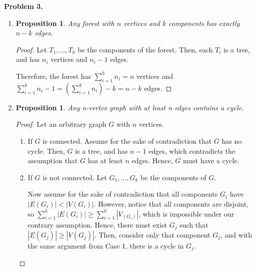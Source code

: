 \documentclass{article}
\newtheorem{prop}[thm]{Proposition}
\begin{document}
\textbf{Problem 3.}
\begin{enumerate}[label=(\alph*)]
    \item \begin{prop}
        Any forest with $n$ vertices and $k$ components has exactly $n-k$ edges. 
    \end{prop}
    \begin{proof}
        Let $T_1, \dots, T_k$ be the components of the forest. 
        Then, each $T_i$ is a tree, and has $n_i$ vertices and $n_i - 1$ edges.

        Therefore, the forest has $\sum_{i=1}^{k}n_i = n$ vertices and $\sum_{i=1}^{k}n_i-1 = \left(\sum_{i=1}^{k}n_i\right)-k = n-k$ edges.
    \end{proof}

    \item \begin{prop}
        Any n-vertex graph with at least n edges contains a cycle.
    \end{prop}
    \begin{proof}
        Let an arbitrary graph $G$ with $n$ vertices. 
        
        \begin{enumerate}[label=Case \arabic*:]
            \item 
            If $G$ is connected. Assume for the sake of contradiction that $G$ has no cycle. 
            Then, $G$ is a tree, and has $n-1$ edges, which contradicts the assumption that $G$ has at least $n$ edges.
            Hence, $G$ must have a cycle.

            \item 
            If $G$ is not connected. Let $G_1, \dots, G_k$ be the components of $G$.
            
            Now assume for the sake of contradiction that all components $G_i$ have $|E(G_i)| < |V(G_i)|$.
            However, notice that all components are disjoint, so $\sum_{i=1}^{k}|E(G_i)| \ge \sum_{i=1}^{k}|V_(G_i)|$, which is impossible under our contrary assumption.
            Hence, there must exist $G_j$ such that $|E(G_j)| \ge |V(G_j)|$.
            Then, consider only that component $G_j$, and with the same argument from Case 1, there is a cycle in $G_j$.
        \end{enumerate}
    \end{proof}
\end{enumerate}
\pagebreak
\end{document}
